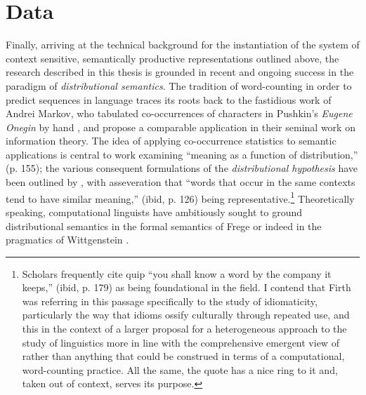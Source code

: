 \section{Data} \label{sec:data}
Finally, arriving at the technical background for the instantiation of the system of context sensitive, semantically productive representations outlined above, the research described in this thesis is grounded in recent and ongoing success in the paradigm of \emph{distributional semantics}.  The tradition of word-counting in order to predict sequences in language traces its roots back to the fastidious work of Andrei Markov, who tabulated co-occurrences of characters in Pushkin's \emph{Eugene Onegin} by hand \citep{BasharinEA2004}, and \cite{ShannonEA1949} propose a comparable application in their seminal work on information theory.  The idea of applying co-occurrence statistics to semantic applications is central to  work examining ``meaning as a function of distribution,'' (p. 155); the various consequent formulations of the \emph{distributional hypothesis} have been outlined by \cite{Sahlgren2008}, with  asseveration that ``words that occur in the same contexts tend to have similar meaning,'' (ibid, p. 126) being representative.\footnote{Scholars frequently cite  quip ``you shall know a word by the company it keeps,'' (ibid, p. 179) as being foundational in the field.  I contend that Firth was referring in this passage specifically to the study of idiomaticity, particularly the way that idioms ossify culturally through repeated use, and this in the context of a larger proposal for a heterogeneous approach to the study of linguistics more in line with the comprehensive emergent view of \cite{MacWhinney1998} rather than anything that could be construed in terms of a computational, word-counting practice.  All the same, the quote has a nice ring to it and, taken out of context, serves its purpose.}  Theoretically speaking, computational linguists have ambitiously sought to ground distributional semantics in the formal semantics of Frege \citep{BaroniEA2014b} or indeed in the pragmatics of Wittgenstein \citep{GrefenstetteEA2011}.

